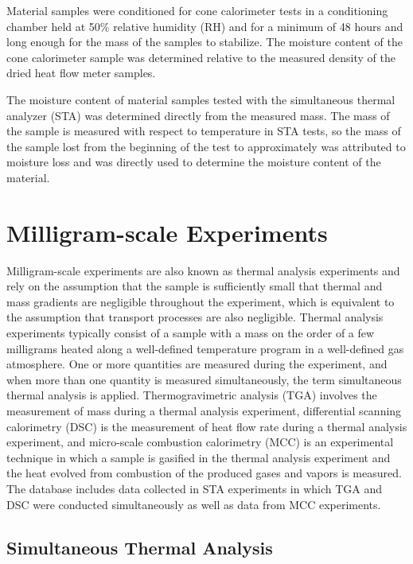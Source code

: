 \documentclass[12pt,oneside]{book}
\begin{document}
Material samples were conditioned for cone calorimeter tests in a conditioning chamber held at 50\% relative humidity (RH) and  for a minimum of 48 hours and long enough for the mass of the samples to stabilize. The moisture content of the cone calorimeter sample was determined relative to the measured density of the dried heat flow meter samples.

The moisture content of material samples tested with the simultaneous thermal analyzer (STA) was determined directly from the measured mass. The mass of the sample is measured with respect to temperature in STA tests, so the mass of the sample lost from the beginning of the test to approximately  was attributed to moisture loss and was directly used to determine the moisture content of the material. 

\section{Milligram-scale Experiments}
\label{sec:mg_scale_exp}

Milligram-scale experiments are also known as thermal analysis experiments and rely on the assumption that the sample is sufficiently small that thermal and mass gradients are negligible throughout the experiment, which is equivalent to the assumption that transport processes are also negligible. Thermal analysis experiments typically consist of a sample with a mass on the order of a few milligrams heated along a well-defined temperature program in a well-defined gas atmosphere. One or more quantities are measured during the experiment, and when more than one quantity is measured simultaneously, the term simultaneous thermal analysis is applied. Thermogravimetric analysis (TGA) involves the measurement of mass during a thermal analysis experiment, differential scanning calorimetry (DSC) is the measurement of heat flow rate during a thermal analysis experiment, and micro-scale combustion calorimetry (MCC) is an experimental technique in which a sample is gasified in the thermal analysis experiment and the heat evolved from combustion of the produced gases and vapors is measured. The database includes data collected in STA experiments in which TGA and DSC were conducted simultaneously as well as data from MCC experiments. 

\subsection{Simultaneous Thermal Analysis}
\label{sec:sta}
\end{document}
